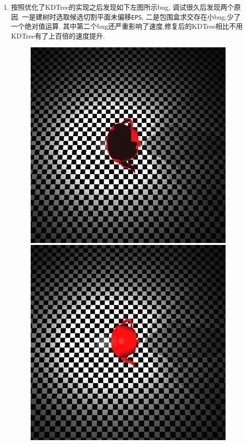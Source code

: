 \begin{enumerate}
\item 按照\cite{kdtree}优化了KDTree的实现之后发现如下左图所示bug, 调试很久后发现两个原因.
  一是建树时选取候选切割平面未偏移\verb|EPS|, 二是包围盒求交存在小bug,少了一个绝对值运算.
  其中第二个bug还严重影响了速度,修复后的KDTree相比不用KDTree有了上百倍的速度提升.
\begin{figure}[H]
  \centering
\begin{minipage}[b]{0.46\linewidth}
  \centering
  \includegraphics[width=\textwidth]{res/bug_teapot.png}
\end{minipage}
\begin{minipage}[b]{0.46\linewidth}
  \centering
  \includegraphics[width=\textwidth]{res/fixed_teapot.png}
\end{minipage}
  \caption{\label{fig:kdtree_bug}}
\end{figure}


\end{enumerate}
